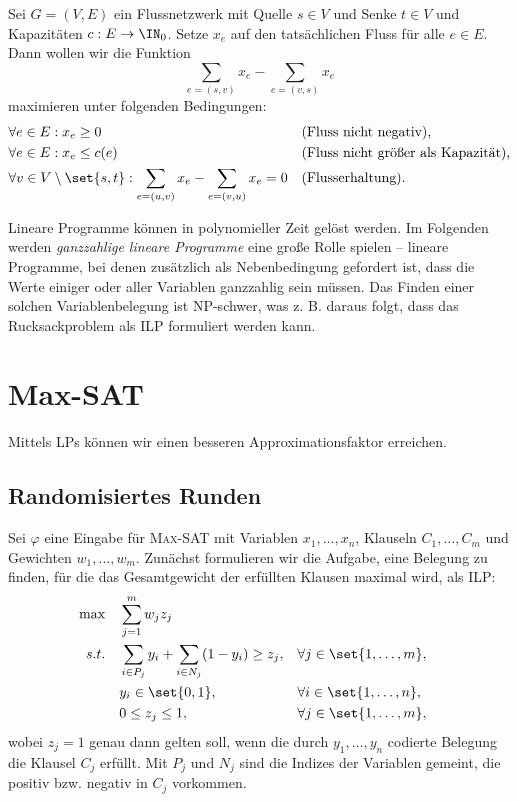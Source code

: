 \documentclass[language=ngerman,algolist]{TemplateLecture}
\begin{document}
\begin{expl}[MaxFlow]
    Sei $G = (V, E)$ ein Flussnetzwerk mit Quelle $s \in V$ und Senke $t \in  V$ und Kapazitäten $c: E \to \IN_0$. Setze $x_e$ auf den tatsächlichen Fluss für alle $e \in E$. Dann wollen wir die Funktion 
    \begin{equation*}
        \sum_{e = (s,v)} x_e - \sum_{e = (v,s)}x_e
    \end{equation*}
    maximieren unter folgenden Bedingungen:
    \begin{align*}
        &\forall e \in E : x_e \geq 0 & & \text{(Fluss nicht negativ),} \\
        &\forall e \in E : x_e \leq c(e) & & \text{(Fluss nicht größer als Kapazität),} \\
        &\forall v \in V \setminus \set{s,t}: \sum_{e = (u,v)} x_e - \sum_{e = (v,u)} x_e = 0 & & \text{(Flusserhaltung).}
    \end{align*}
\end{expl}

Lineare Programme können in polynomieller Zeit gelöst werden. Im Folgenden werden \emph{ganzzahlige lineare Programme} eine große Rolle spielen -- lineare Programme, bei denen zusätzlich als Nebenbedingung gefordert ist, dass die Werte einiger oder aller Variablen ganzzahlig sein müssen. Das Finden einer solchen Variablenbelegung ist NP-schwer, was z. B. daraus folgt, dass das Rucksackproblem als ILP formuliert werden kann.

\section{Max-SAT}

Mittels LPs können wir einen besseren Approximationsfaktor erreichen.

\subsection{Randomisiertes Runden}

Sei $\varphi$ eine Eingabe für \textsc{Max-SAT} mit Variablen $x_1, \ldots, x_n$, Klauseln $C_1, \ldots, C_m$ und Gewichten $w_1, \ldots, w_m$. Zunächst formulieren wir die Aufgabe, eine Belegung zu finden, für die das Gesamtgewicht der erfüllten Klausen maximal wird, als ILP:
\begin{align*}
    \max \quad & \sum_{j = 1}^m w_j z_j \\ 
    s.t. \quad & \sum_{i \in P_j} y_i + \sum_{i \in N_j} (1-y_i) \geq z_j, & & \forall j \in \set{1,\ldots,m}, \\
    & y_i \in \set{0,1}, & & \forall i \in \set{1,\ldots,n}, \\
    & 0 \leq z_j \leq 1, & & \forall j \in \set{1,\ldots,m},
\end{align*}
wobei $z_j = 1$ genau dann gelten soll, wenn die durch $y_1, \ldots, y_n$ codierte Belegung die Klausel $C_j$ erfüllt. Mit $P_j$ und $N_j$ sind die Indizes der Variablen gemeint, die positiv bzw. negativ in $C_j$ vorkommen.
\end{document}
